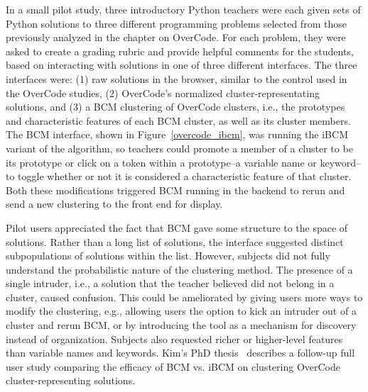 In a small pilot study, three introductory Python teachers were each given sets of Python solutions to three different programming problems selected from those previously analyzed in the chapter on OverCode. For each problem, they were asked to create a grading rubric and provide helpful comments for the students, based on interacting with solutions in one of three different interfaces. The three interfaces were: (1) raw solutions in the browser, similar to the control used in the OverCode studies, (2) OverCode's normalized cluster-representating solutions, and (3) a BCM clustering of OverCode clusters, i.e., the prototypes and characteristic features of each BCM cluster, as well as its cluster members. The BCM interface, shown in Figure~\ref{overcode_ibcm}, was running the iBCM variant of the algorithm, so teachers could promote a member of a cluster to be its prototype or click on a token within a prototype--a variable name or keyword--to toggle whether or not it is considered a characteristic feature of that cluster. Both these modifications triggered BCM running in the backend to rerun and send a new clustering to the front end for display. 

Pilot users appreciated the fact that BCM gave some structure to the space of solutions. Rather than a long list of solutions, the interface suggested distinct subpopulations of solutions within the list. However, subjects did not fully understand the probabilistic nature of the clustering method. The presence of a single intruder, i.e., a solution that the teacher believed did not belong in a cluster, caused confusion. This could be ameliorated by giving users more ways to modify the clustering, e.g., allowing users the option to kick an intruder out of a cluster and rerun BCM, or by introducing the tool as a mechanism for discovery instead of organization. Subjects also requested richer or higher-level features than variable names and keywords. Kim's PhD thesis~\cite{beenthesis} describes a follow-up full user study comparing the efficacy of BCM vs. iBCM on clustering OverCode cluster-representing solutions.

